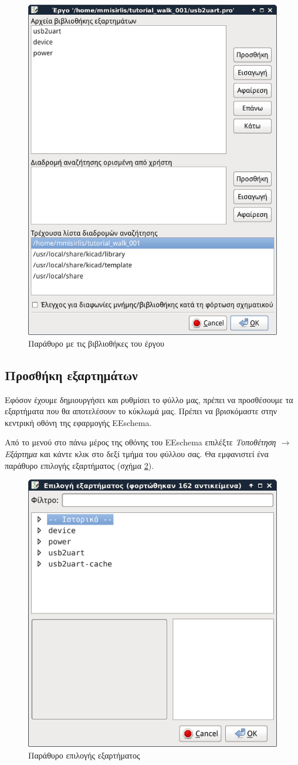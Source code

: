 \documentclass[a4paper]{article}
\begin{document}
\begin{figure}
  \begin{center}
    \includegraphics[width=.5\textwidth]{img/eesch-dial-libr.png}
    \caption{Παράθυρο με τις βιβλιοθήκες του έργου}
    \label{fig:eesch-dial-libr}
  \end{center}
\end{figure}


\subsection{Προσθήκη εξαρτημάτων}
Εφόσον έχουμε δημιουργήσει και ρυθμίσει το φύλλο μας, πρέπει να προσθέσουμε τα εξαρτήματα που θα αποτελέσουν το κύκλωμά μας. Πρέπει να βρισκόμαστε στην κεντρική οθόνη της εφαρμογής \textenglish{EEschema}.

Από το μενού στο πάνω μέρος της οθόνης του \textenglish{EEschema} επιλέξτε \textit{Τοποθέτηση $\rightarrow$ Εξάρτημα} και κάντε κλικ στο δεξί τμήμα του φύλλου σας. Θα εμφανιστεί ένα παράθυρο επιλογής εξαρτήματος (σχήμα \ref{fig:eesch-dial-addcomp}).

\begin{figure}
  \begin{center}
    \includegraphics[width=.5\textwidth]{img/eesch-dial-addcomp.png}
    \caption{Παράθυρο επιλογής εξαρτήματος}
    \label{fig:eesch-dial-addcomp}
  \end{center}
\end{figure}
\end{document}
